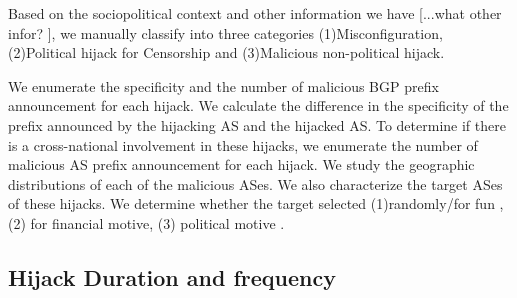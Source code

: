 Based on the sociopolitical context and other information we have [...what other infor? ], we manually classify into three categories (1)Misconfiguration, (2)Political hijack for Censorship and (3)Malicious non-political hijack. 

We enumerate the specificity and the number of malicious BGP prefix announcement for each hijack. We calculate the difference in the specificity of the prefix announced by the hijacking AS and the hijacked AS. To determine if there is a cross-national involvement in these hijacks, we enumerate the number of malicious AS prefix announcement for each hijack. We study the geographic distributions of each of the malicious ASes.
We also characterize the target ASes of these hijacks. We determine whether the target selected (1)randomly/for fun , (2) for financial motive, (3) political motive .
\subsection{Hijack Duration and frequency}

